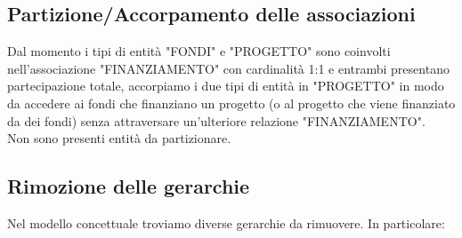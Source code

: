         \subsection{Partizione/Accorpamento delle associazioni}
            Dal momento i tipi di entità "FONDI" e "PROGETTO" sono coinvolti nell'associazione "FINANZIAMENTO" con cardinalità 1:1 e entrambi presentano partecipazione totale, accorpiamo i due tipi di entità in "PROGETTO" in modo da accedere ai fondi che finanziano un progetto (o al progetto che viene finanziato da dei fondi) senza attraversare un'ulteriore relazione "FINANZIAMENTO".\\
            Non sono presenti entità da partizionare.

\newpage

        \subsection{Rimozione delle gerarchie}
            Nel modello concettuale troviamo diverse gerarchie da rimuovere. In particolare:
